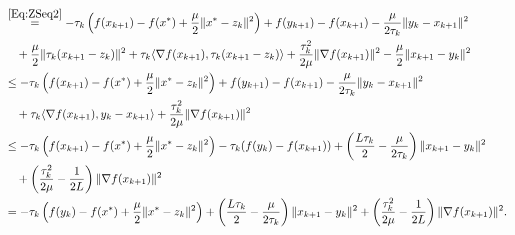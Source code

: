 \documentclass[11pt]{article}
\theoremstyle{plain}
\begin{document}
\begin{align*}
&\overset{\eqref{Eq:ZSeq2}}{=} -\tau_k\left( f(x_{k+1} ) - f(x^\ast) + \frac{\mu}{2}\|x^\ast - z_k\|^2 \right) + f(y_{k+1}) - f(x_{k+1})   - \frac{\mu}{2\tau_k}\|y_k - x_{k+1}\|^2  \\
&\quad   + \frac{\mu}{2}\|\tau_k(x_{k+1} - z_k)\|^2 + \tau_k \langle \nabla f(x_{k+1}), \tau_k(x_{k+1} - z_k)\rangle + \frac{\tau_k^2}{2\mu}\|\nabla f(x_{k+1})\|^2  - \frac{\mu}{2} \|x_{k+1} - y_{k}\|^2 \\
&\leq -\tau_k\left( f(x_{k+1} ) - f(x^\ast) + \frac{\mu}{2}\|x^\ast - z_k\|^2 \right) + f(y_{k+1}) - f(x_{k+1})   - \frac{\mu}{2\tau_k}\|y_k - x_{k+1}\|^2      \\
&\quad  + \tau_k \langle \nabla f(x_{k+1}), y_k - x_{k+1}\rangle + \frac{\tau_k^2}{2\mu}\|\nabla f(x_{k+1})\|^2  \\
&\leq -\tau_k\left( f(x_{k+1} ) - f(x^\ast) + \frac{\mu}{2}\|x^\ast - z_k\|^2 \right)  -\tau_k( f(y_k) - f(x_{k+1})) + \left( \frac{L\tau_k}{2}- \frac{\mu}{2\tau_k}\right)\|x_{k+1} - y_k\|^2  \\
&\quad + \left(\frac{\tau_k^2}{2\mu}-\frac{1}{2L}\right)\|\nabla f(x_{k+1})\|^2   \\
&=-\tau_k\left( f(y_k) - f(x^\ast) + \frac{\mu}{2}\|x^\ast - z_k\|^2 \right) + \left( \frac{L\tau_k}{2}- \frac{\mu}{2\tau_k}\right)\|x_{k+1} - y_k\|^2  + \left(\frac{\tau_k^2}{2\mu}-\frac{1}{2L}\right)\|\nabla f(x_{k+1})\|^2.   
\end{align*}
\end{document}

